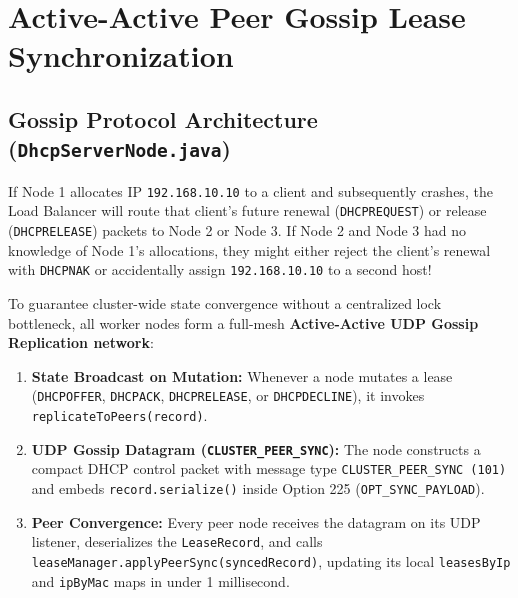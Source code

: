 \documentclass[11pt,a4paper]{article}
\begin{document}
\section{Active-Active Peer Gossip Lease Synchronization}

\subsection{Gossip Protocol Architecture (\texttt{DhcpServerNode.java})}
If Node 1 allocates IP \texttt{192.168.10.10} to a client and subsequently crashes, the Load Balancer will route that client's future renewal (\texttt{DHCPREQUEST}) or release (\texttt{DHCPRELEASE}) packets to Node 2 or Node 3. If Node 2 and Node 3 had no knowledge of Node 1's allocations, they might either reject the client's renewal with \texttt{DHCPNAK} or accidentally assign \texttt{192.168.10.10} to a second host!

To guarantee cluster-wide state convergence without a centralized lock bottleneck, all worker nodes form a full-mesh \textbf{Active-Active UDP Gossip Replication network}:
\begin{enumerate}[leftmargin=2em]
    \item \textbf{State Broadcast on Mutation:} Whenever a node mutates a lease (\texttt{DHCPOFFER}, \texttt{DHCPACK}, \texttt{DHCPRELEASE}, or \texttt{DHCPDECLINE}), it invokes \texttt{replicateToPeers(record)}.
    \item \textbf{UDP Gossip Datagram (\texttt{CLUSTER\_PEER\_SYNC}):} The node constructs a compact DHCP control packet with message type \texttt{CLUSTER\_PEER\_SYNC (101)} and embeds \texttt{record.serialize()} inside Option 225 (\texttt{OPT\_SYNC\_PAYLOAD}).
    \item \textbf{Peer Convergence:} Every peer node receives the datagram on its UDP listener, deserializes the \texttt{LeaseRecord}, and calls \texttt{leaseManager.applyPeerSync(syncedRecord)}, updating its local \texttt{leasesByIp} and \texttt{ipByMac} maps in under 1 millisecond.
\end{enumerate}
\end{document}
